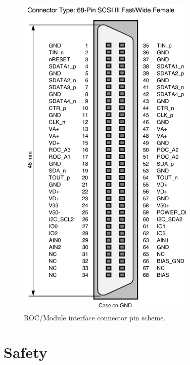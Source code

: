 \begin{figure}[hbtp]
    \begin{center}
	\includegraphics[width=85mm]{img/DTB_adapterplug.pdf}
	\caption{ROC/Module interface connector pin scheme.}
	\label{fig:ROCmoduleInterfaceConnector}
    \end{center}
\end{figure}

\section{Safety}


